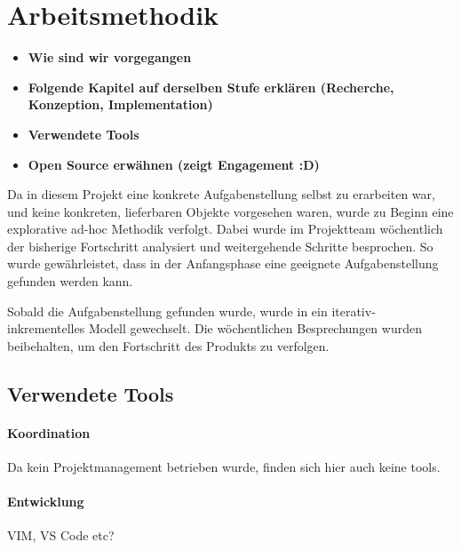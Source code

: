 \section{Arbeitsmethodik}
\begin{itemize}
    \item \textbf{Wie sind wir vorgegangen}
    \item \textbf{Folgende Kapitel auf derselben Stufe erklären (Recherche, Konzeption, Implementation)}
    \item \textbf{Verwendete Tools}
    \item \textbf{Open Source erwähnen (zeigt Engagement :D)}
\end{itemize}
Da in diesem Projekt eine konkrete Aufgabenstellung selbst zu erarbeiten war, und keine konkreten, lieferbaren Objekte vorgesehen waren, wurde zu Beginn eine explorative ad-hoc Methodik verfolgt. Dabei wurde im Projektteam wöchentlich der bisherige Fortschritt analysiert und weitergehende Schritte besprochen. So wurde gewährleistet, dass in der Anfangsphase eine geeignete Aufgabenstellung gefunden werden kann.
\par
Sobald die Aufgabenstellung gefunden wurde, wurde in ein iterativ- inkrementelles Modell gewechselt. Die wöchentlichen Besprechungen wurden beibehalten, um den Fortschritt des Produkts zu verfolgen.

\subsection{Verwendete Tools}
\paragraph{Koordination}
Da kein Projektmanagement betrieben wurde, finden sich hier auch keine tools.

\paragraph{Entwicklung}
VIM, VS Code etc?